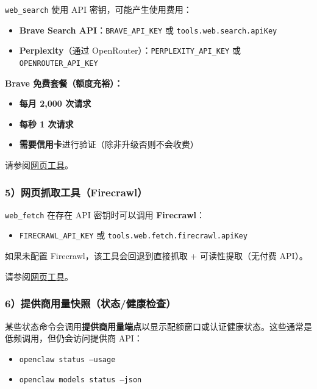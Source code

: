 \texttt{web\_search} 使用 API 密钥，可能产生使用费用：

\begin{itemize}
  \item \textbf{Brave Search API}：\texttt{BRAVE\_API\_KEY} 或 \texttt{tools.web.search.apiKey}
  \item \textbf{Perplexity}（通过 OpenRouter）：\texttt{PERPLEXITY\_API\_KEY} 或 \texttt{OPENROUTER\_API\_KEY}
\end{itemize}


\textbf{Brave 免费套餐（额度充裕）：}

\begin{itemize}
  \item \textbf{每月 2,000 次请求}
  \item \textbf{每秒 1 次请求}
  \item \textbf{需要信用卡}进行验证（除非升级否则不会收费）
\end{itemize}


请参阅\href{/tools/web}{网页工具}。

\subsubsection{5）网页抓取工具（Firecrawl）}


\texttt{web\_fetch} 在存在 API 密钥时可以调用 \textbf{Firecrawl}：

\begin{itemize}
  \item \texttt{FIRECRAWL\_API\_KEY} 或 \texttt{tools.web.fetch.firecrawl.apiKey}
\end{itemize}


如果未配置 Firecrawl，该工具会回退到直接抓取 + 可读性提取（无付费 API）。

请参阅\href{/tools/web}{网页工具}。

\subsubsection{6）提供商用量快照（状态/健康检查）}


某些状态命令会调用\textbf{提供商用量端点}以显示配额窗口或认证健康状态。这些通常是低频调用，但仍会访问提供商 API：

\begin{itemize}
  \item \texttt{openclaw status --usage}
  \item \texttt{openclaw models status --json}
\end{itemize}



